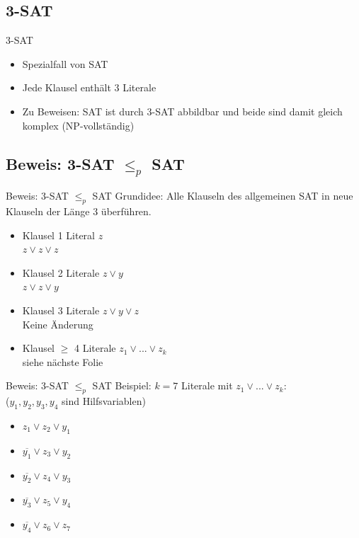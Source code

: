 \documentclass[12pt,donthandout,notes=dontshow,xcolor=table]{beamer}
\begin{document}
\subsection{3-SAT}
\begin{frame}{3-SAT}
\begin{itemize}
\item Spezialfall von SAT
\item Jede Klausel enthält 3 Literale
\item Zu Beweisen: SAT ist durch 3-SAT abbildbar und beide sind damit gleich komplex (NP-vollständig)
\end{itemize}
\end{frame}

\subsection{Beweis: 3-SAT $\leq_p$ SAT}
\begin{frame}{Beweis: 3-SAT \(\leq_p\) SAT}
Grundidee: Alle Klauseln des allgemeinen SAT in neue Klauseln der Länge 3 überführen.
\begin{itemize}
\item Klausel 1 Literal  \(z\) \\ \textrightarrow \(z \vee z \vee z\)
\item Klausel 2 Literale \(z \vee y\) \\ \textrightarrow \(z \vee z \vee y\)
\item Klausel 3 Literale \(z \vee y \vee z\) \\ \textrightarrow Keine Änderung
\item Klausel \(\ge\) 4 Literale \(z_1 \vee ... \vee z_k\) \\ \textrightarrow siehe nächste Folie
\end{itemize}
\end{frame}

\begin{frame}{Beweis: 3-SAT \(\leq_p\) SAT}
Beispiel: \(k = 7\) Literale mit \(z_1 \vee ... \vee z_k\):\\
(\(y_1,y_2,y_3,y_4\) sind Hilfsvariablen)
\begin{itemize}
\item \(z_1 \vee z_2 \vee y_1\)
\item \(\overline{y_1} \vee z_3 \vee y_2\)
\item \(\overline{y_2} \vee z_4 \vee y_3\)
\item \(\overline{y_3} \vee z_5 \vee y_4\)
\item \(\overline{y_4} \vee z_6 \vee z_7\)\\
\end{itemize}
\end{frame}
\end{document}
